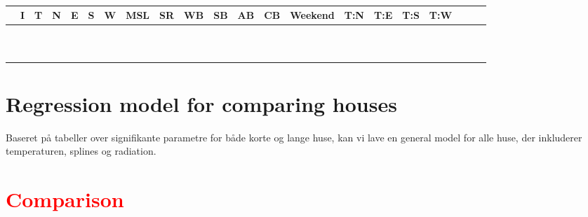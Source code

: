 \begin{table}
    \centering
    \begin{tabular}{ccccccccccccccccccccc}
     \hline
     & I & T & N & E & S & W & MSL & SR & WB & SB & AB & CB & Weekend & T:N & T:E & T:S & T:W\\
    \hline
     & & & & & & & & & & & & & & & & & & & \\
     & & & & & & & & & & & & & & & & & & & \\
     & & & & & & & & & & & & & & & & & & & \\
     & & & & & & & & & & & & & & & & & & & \\
     & & & & & & & & & & & & & & & & & & & \\
     & & & & & & & & & & & & & & & & & & & \\
     & & & & & & & & & & & & & & & & & & & \\
     & & & & & & & & & & & & & & & & & & & \\
     & & & & & & & & & & & & & & & & & & & \\
     & & & & & & & & & & & & & & & & & & & \\
    \hline
    \end{tabular}
    \caption{}
    \label{lmMult_full_L}
\end{table}

\section{Regression model for comparing houses}
Baseret på tabeller over signifikante parametre for både korte og lange huse, kan vi lave en general model for alle huse, der inkluderer temperaturen, splines og radiation.

\section{\textcolor{red}{Comparison}}
